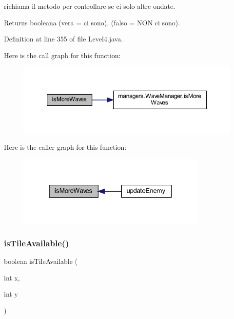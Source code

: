 richiama il metodo per controllare se ci solo altre ondate. 

\begin{DoxyReturn}{Returns}
booleana (vera = ci sono), (falso = N\+ON ci sono). 
\end{DoxyReturn}


Definition at line 355 of file Level4.\+java.

Here is the call graph for this function\+:\nopagebreak
\begin{figure}[H]
\begin{center}
\leavevmode
\includegraphics[width=347pt]{classscenes_1_1_level4_a999f12a033f49f299ad7f55bcae24447_cgraph}
\end{center}
\end{figure}
Here is the caller graph for this function\+:\nopagebreak
\begin{figure}[H]
\begin{center}
\leavevmode
\includegraphics[width=268pt]{classscenes_1_1_level4_a999f12a033f49f299ad7f55bcae24447_icgraph}
\end{center}
\end{figure}
\mbox{\label{classscenes_1_1_level4_aaeac2ee6b3a920a21928ee7b3dc8e7a9}} 
\subsubsection{\texorpdfstring{is\+Tile\+Available()}{isTileAvailable()}}
{\footnotesize\ttfamily boolean is\+Tile\+Available (\begin{DoxyParamCaption}\item[{int}]{x,  }\item[{int}]{y }\end{DoxyParamCaption})\hspace{0.3cm}{\ttfamily [private]}}



